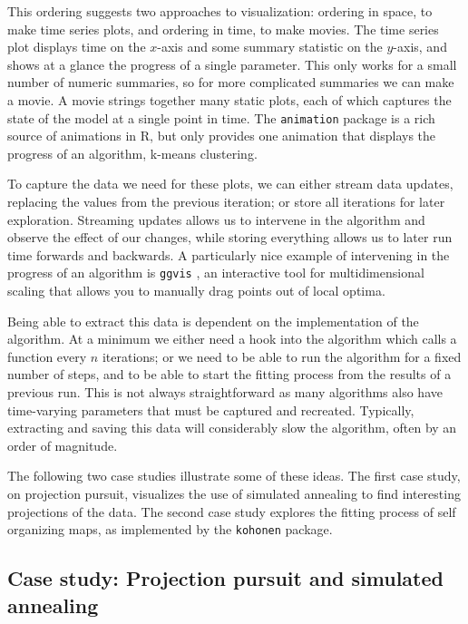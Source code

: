 \documentclass[preprint]{imsart}
\begin{document}
This ordering suggests two approaches to visualization: ordering in space, to make time series plots, and ordering in time, to make movies.  The time series plot displays time on the $x$-axis and some summary statistic on the $y$-axis, and shows at a glance the progress of a single parameter.  This only works for a small number of numeric summaries, so for more complicated summaries we can make a movie.  A movie strings together many static plots, each of which captures the state of the model at a single point in time.  The {\tt animation} package \citep{animation} is a rich source of animations in R, but only provides one animation that displays the progress of an algorithm, k-means clustering.

To capture the data we need for these plots, we can either stream data updates, replacing the values from the previous iteration; or store all iterations for later exploration.  Streaming updates allows us to intervene in the algorithm and observe the effect of our changes, while storing everything allows us to later run time forwards and backwards.  A particularly nice example of intervening in the progress of an algorithm is {\tt ggvis} \citep{buja:2008}, an interactive tool for multidimensional scaling that allows you to manually drag points out of local optima.

Being able to extract this data is dependent on the implementation of the algorithm.  At a minimum we either need a hook into the algorithm which calls a function every $n$ iterations; or we need to be able to run the algorithm for a fixed number of steps, and to be able to start the fitting process from the results of a previous run.  This is not always straightforward as many algorithms also have time-varying parameters that must be captured and recreated. Typically, extracting and saving this data will considerably slow the algorithm, often by an order of magnitude.

The following two case studies illustrate some of these ideas.  The first case study, on projection pursuit, visualizes the use of simulated annealing to find interesting projections of the data.  The second case study explores the fitting process of self organizing maps, as implemented by the {\tt kohonen} package.

\subsection{Case study: Projection pursuit and simulated annealing}
\label{sub:guided}
\end{document}
